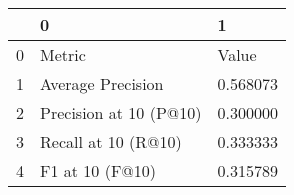 \begin{tabular}{lll}
\toprule
 & 0 & 1 \\
\midrule
0 & Metric & Value \\
1 & Average Precision & 0.568073 \\
2 & Precision at 10 (P@10) & 0.300000 \\
3 & Recall at 10 (R@10) & 0.333333 \\
4 & F1 at 10 (F@10) & 0.315789 \\
\bottomrule
\end{tabular}
